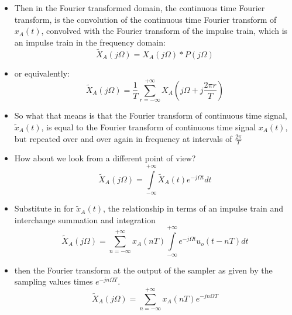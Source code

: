 \documentclass[pdflatex,compress,mathserif]{beamer}
\begin{document}
\begin{frame}
	\begin{itemize}
		\item Then in the Fourier transformed domain, the continuous time Fourier transform, is the convolution of the continuous time Fourier transform of $ x_A(t) $, convolved with the Fourier transform of the impulse train, which is an impulse train in the frequency domain:
		\[ \tilde{X}_A(j\Omega) = X_A(j\Omega)*P(j\Omega) \]
		\item or equivalently:
		\[ \tilde{X}_A(j\Omega) = \frac{1}{T} \sum_{r = -\infty}^{+ \infty} X_A \left(j\Omega+j\frac{2 \pi r}{T}\right) \]
	\end{itemize}
\end{frame}

\begin{frame}
	\begin{itemize}
		\item So what that means is that the Fourier transform of continuous time signal, $ \tilde{x}_A(t) $, is equal to the Fourier transform of continuous time signal $ x_A(t) $, but repeated over and over again in frequency at intervals of $ \frac{2\pi}{T} $
	\end{itemize}
\end{frame}

\begin{frame}
	\begin{itemize}
		\item How about we look from a different point of view?
		\[ \tilde{X}_A(j\Omega) = \int\limits_{-\infty}^{+\infty} \tilde{X}_A(t) e^{-j \Omega t} dt \]
		\item Substitute in for $ \tilde{x}_A(t) $, the relationship in terms of an impulse train and interchange summation and integration
		\[ \tilde{X}_A(j\Omega) = \sum_{n = - \infty}^{+\infty} x_A(nT)  \int\limits_{-\infty}^{+\infty} e^{-j \Omega t} u_o (t - nT) dt \]
		\item then the Fourier transform at the output of the sampler as given by the sampling values times $ e^{-jn \Omega T} $.
		\[ \tilde{X}_A(j\Omega) = \sum_{n = - \infty}^{+\infty} x_A(nT)  e^{-jn\Omega T} \]
	\end{itemize}
\end{frame}
\end{document}
